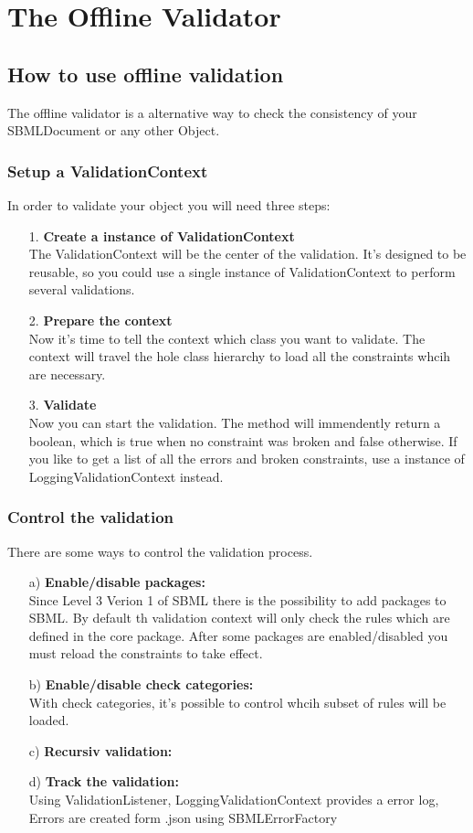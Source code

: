 \section[Offline Validation]{The Offline Validator}
\subsection{How to use offline validation}

The offline validator is a alternative way to check the consistency of your SBMLDocument or any other Object.
\subsubsection{Setup a ValidationContext}
In order to validate your object you will need three steps:
\begin{itemize}
\item[1.] \textbf{Create a instance of ValidationContext} \\
The ValidationContext will be the center of the validation. It's designed to be reusable, so you could use a single instance of ValidationContext to perform several validations.
\item[2.] \textbf{Prepare the context} \\
Now it's time to tell the context which class you want to validate. The context will travel the hole class hierarchy to load all the constraints whcih are necessary.
\item[3.] \textbf{Validate} \\
Now you can start the validation. The method will immendently return a boolean, which is true when no constraint was broken and false otherwise. If you like to get a list of all the errors and broken constraints, use a instance of LoggingValidationContext instead.
\end{itemize}

\subsubsection{Control the validation}
There are some ways to control the validation process.
\begin{itemize}
\item[a)] \textbf{Enable/disable packages:}\\
Since Level 3 Verion 1 of SBML there is the possibility to add packages to SBML. By default th validation context will only check the rules which are defined in the core package. After some packages are enabled/disabled you must reload the constraints to take effect.
\item[b)] \textbf{Enable/disable check categories:}\\
With check categories, it's possible to control whcih subset of rules will be loaded.
\item[c)] \textbf{Recursiv validation:}\\
\item[d)] \textbf{Track the validation:}\\
Using ValidationListener, LoggingValidationContext provides a error log, Errors are created form .json using SBMLErrorFactory
\end{itemize}


